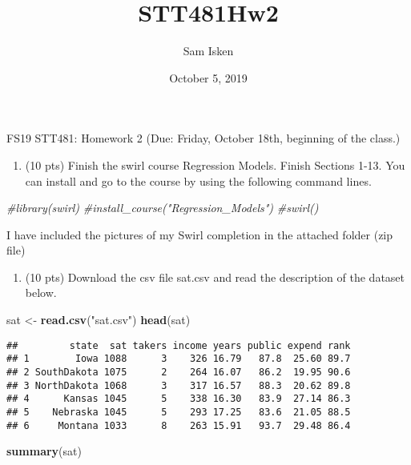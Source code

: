\documentclass[]{article}
\title{STT481Hw2}
\author{Sam Isken}
\date{October 5, 2019}
\newenvironment{Shaded}{\begin{snugshade}}{\end{snugshade}}
\newcommand{\KeywordTok}[1]{\textcolor[rgb]{0.13,0.29,0.53}{\textbf{#1}}}
\newcommand{\StringTok}[1]{\textcolor[rgb]{0.31,0.60,0.02}{#1}}
\newcommand{\CommentTok}[1]{\textcolor[rgb]{0.56,0.35,0.01}{\textit{#1}}}
\newcommand{\NormalTok}[1]{#1}
\providecommand{\tightlist}{%
  \setlength{\itemsep}{0pt}\setlength{\parskip}{0pt}}
\begin{document}
\maketitle

FS19 STT481: Homework 2 (Due: Friday, October 18th, beginning of the
class.)

\begin{enumerate}
\def\labelenumi{\arabic{enumi}.}
\tightlist
\item
  (10 pts) Finish the swirl course Regression Models. Finish Sections
  1-13. You can install and go to the course by using the following
  command lines.
\end{enumerate}

\begin{Shaded}
\begin{Highlighting}[]
\CommentTok{#library(swirl)}
\CommentTok{#install_course("Regression_Models")}
\CommentTok{#swirl()}
\end{Highlighting}
\end{Shaded}

I have included the pictures of my Swirl completion in the attached
folder (zip file)

\begin{enumerate}
\def\labelenumi{\arabic{enumi}.}
\setcounter{enumi}{1}
\tightlist
\item
  (10 pts) Download the csv file sat.csv and read the description of the
  dataset below.
\end{enumerate}

\begin{Shaded}
\begin{Highlighting}[]
\NormalTok{sat <-}\StringTok{ }\KeywordTok{read.csv}\NormalTok{(}\StringTok{"sat.csv"}\NormalTok{)}
\KeywordTok{head}\NormalTok{(sat)}
\end{Highlighting}
\end{Shaded}

\begin{verbatim}
##         state  sat takers income years public expend rank
## 1        Iowa 1088      3    326 16.79   87.8  25.60 89.7
## 2 SouthDakota 1075      2    264 16.07   86.2  19.95 90.6
## 3 NorthDakota 1068      3    317 16.57   88.3  20.62 89.8
## 4      Kansas 1045      5    338 16.30   83.9  27.14 86.3
## 5    Nebraska 1045      5    293 17.25   83.6  21.05 88.5
## 6     Montana 1033      8    263 15.91   93.7  29.48 86.4
\end{verbatim}

\begin{Shaded}
\begin{Highlighting}[]
\KeywordTok{summary}\NormalTok{(sat)}
\end{Highlighting}
\end{Shaded}
\end{document}

